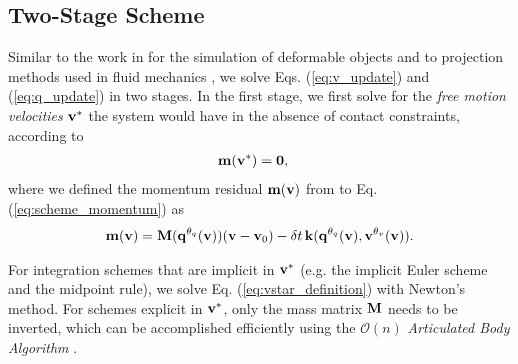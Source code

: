 \subsection{Two-Stage Scheme}

Similar to the work in \cite{bib:duriez2005realistic} for the simulation of
deformable objects and to projection methods used in fluid mechanics
\cite{bib::bell1991efficient}, we solve Eqs. (\ref{eq:v_update}) and
(\ref{eq:q_update}) in two stages. In the first stage, we first solve for the
\emph{free motion velocities} ${\mathbf{v}}^*$ the system would have in the absence of
contact constraints, according to
\begin{align}
	\mf{m}(\mf{v}^*) &= \mf{0},
	\label{eq:vstar_definition}
\end{align}
where we defined the momentum residual ${\mathbf{m}}({\mathbf{v}})$ from to Eq.
(\ref{eq:scheme_momentum}) as
\begin{multline}
	\mf{m}(\mf{v}) =
	\mf{M}(\mf{q}^{\theta_{q}}(\mf{v}))(\mf{v}-\mf{v}_0) -
	\delta t\,\mf{k}(\mf{q}^{\theta_{q}}(\mf{v}),\mf{v}^{\theta_v}(\mf{v})).
	\label{eq:m_definition}
\end{multline}

For integration schemes that are implicit in ${\mathbf{v}}^*$ (e.g. the implicit Euler
scheme and the midpoint rule), we solve Eq. (\ref{eq:vstar_definition}) with
Newton's method. For schemes explicit in ${\mathbf{v}}^*$, only the mass matrix
${\mathbf{M}}$ needs to be inverted, which can be accomplished efficiently using the
$\mathcal{O}(n)$ \emph{Articulated Body Algorithm}
\cite{bib:featherstone2008_rigid_body_dynamics_algorithms}.

